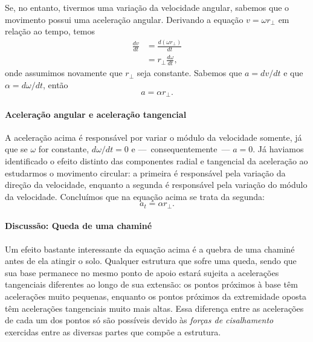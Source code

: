 Se, no entanto, tivermos uma variação da velocidade angular, sabemos que o movimento possui uma aceleração angular. Derivando a equação $v = \omega r_\perp$ em relação ao tempo, temos
\begin{align}
	\frac{dv}{dt} &= \frac{d(\omega r_\perp)}{dt} \\
	&=r_\perp \frac{d\omega}{dt},
\end{align}
%
onde assumimos novamente que $r_\perp$ seja constante. Sabemos que $a=dv/dt$ e que $\alpha = d\omega/dt$, então
\begin{equation}
	a = \alpha r_\perp.
\end{equation}

\paragraph{Aceleração angular e aceleração tangencial}

A aceleração acima é responsável por variar o módulo da velocidade somente, já que se $\omega$ for constante, $d\omega/dt = 0$ e ---~consequentemente~--- $a=0$. Já haviamos identificado o efeito distinto das componentes radial e tangencial da aceleração ao estudarmos o movimento circular: a primeira é responsável pela variação da direção da velocidade, enquanto a segunda é responsável pela variação do módulo da velocidade. Concluímos que na equação acima se trata da segunda:
\begin{equation}
	a_t = \alpha r_\perp.
\end{equation}

\paragraph{Discussão: Queda de uma chaminé}

Um efeito bastante interessante da equação acima é a quebra de uma chaminé antes de ela atingir o solo. Qualquer estrutura que sofre uma queda, sendo que sua base permanece no mesmo ponto de apoio estará sujeita a acelerações tangenciais diferentes ao longo de sua extensão: os pontos próximos à base têm acelerações muito pequenas, enquanto os pontos próximos da extremidade oposta têm acelerações tangenciais muito mais altas. Essa diferença entre as acelerações de cada um dos pontos só são possíveis devido às \emph{forças de cisalhamento} exercidas entre as diversas partes que compõe a estrutura.

